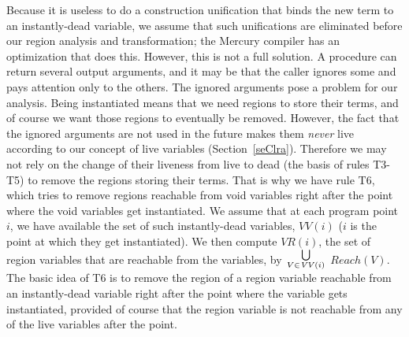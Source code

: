 \documentclass{tlp}
\newcommand{\VV}[1]{\ensuremath{\mathit{VV}(#1)}}
\newcommand{\VR}[1]{\ensuremath{\mathit{VR}(#1)}}
\newcommand{\Reach}[1]{\ensuremath{{Reach}(#1)}}
\begin{document}
Because it is useless to do a construction unification
that binds the new term to an instantly-dead variable,
we assume that such unifications are eliminated
before our region analysis and transformation;
the Mercury compiler has an optimization that does this.
However, this is not a full solution.
A procedure can return several output arguments,
and it may be that the caller ignores some
and pays attention only to the others.
The ignored arguments pose a problem for our analysis.
Being instantiated means that we need regions to store their terms,
and of course we want those regions to eventually be removed.
However, the fact that the ignored arguments are not used in the future
makes them \emph{never} live
according to our concept of live variables (Section~\ref{seClra}).
Therefore we may not rely on the change of their liveness from live to dead
(the basis of rules T3-T5)
to remove the regions storing their terms.
That is why we have rule T6,
which tries to remove regions reachable from void variables
right after the point where the void variables get instantiated.
We assume that at each program point $i$,
we have available the set of such instantly-dead variables, \VV{i}
($i$ is the point at which they get instantiated).
We then compute \VR{i}, the set of region variables that
are reachable from the variables, by
\hbox{\raise-1mm\hbox{$\textstyle
\bigcup \atop \scriptstyle {V \in \VV{i}}$}} \Reach{V}.
The basic idea of T6 is to remove the region
of a region variable reachable from an instantly-dead variable
right after the point where the variable gets instantiated,
provided of course that the region variable
is not reachable from any of the live variables after the point.
\end{document}
